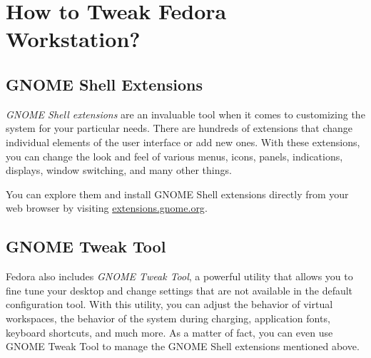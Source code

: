 \chapter*{How to Tweak Fedora Workstation?}
\section*{GNOME Shell Extensions}

\emph{GNOME Shell extensions} are an invaluable tool when it comes to customizing the system for your particular needs. There are hundreds of extensions that change individual elements of the user interface or add new ones. With these extensions, you can change the look and feel of various menus, icons, panels, indications, displays, window switching, and many other things.

You can explore them and install GNOME Shell extensions directly from your web browser by visiting \url{extensions.gnome.org}.

\section*{GNOME Tweak Tool}

Fedora also includes \emph{GNOME Tweak Tool}, a powerful utility that allows you to fine tune your desktop and change settings that are not available in the default configuration tool. With this utility, you can adjust the behavior of virtual workspaces, the behavior of the system during charging, application fonts, keyboard shortcuts, and much more. As a matter of fact, you can even use GNOME Tweak Tool to manage the GNOME Shell extensions mentioned above.
\endinput

